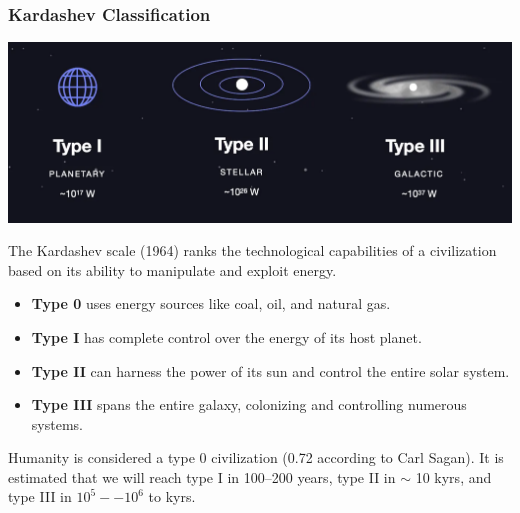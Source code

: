 \begin{frame}
\frametitle{Kardashev Classification}

\includegraphics[scale=0.15]{kardashev.png}

The Kardashev scale (1964) ranks the technological capabilities of a civilization based on its ability to manipulate and exploit energy. 
\begin{itemize}
\item {\bf Type 0} uses energy sources like coal, oil, and natural gas.
\item {\bf Type I} has complete control over the energy of its host planet.
\item {\bf Type II} can harness the power of its sun and control the entire solar system.
\item {\bf Type III} spans the entire galaxy, colonizing and controlling numerous systems. 
\end{itemize}

Humanity is considered a type 0 civilization (0.72 according to Carl Sagan). It is estimated that we will reach type I in 100–200 years, type II in $\sim$ 10 kyrs, and type III in $10^5--10^6$ to kyrs.

\end{frame}

